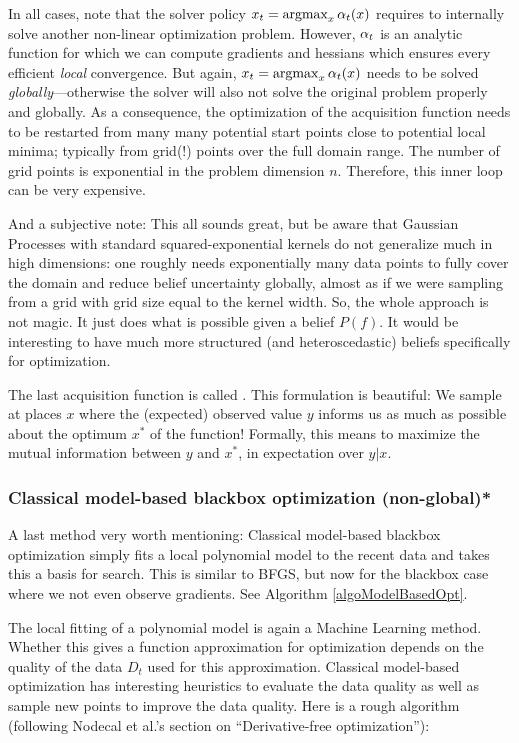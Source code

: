 In all cases, note that the solver policy $x_t = \operatorname*{argmax}_x \alpha_t(x)$
requires to internally solve another non-linear optimization
problem. However, $\alpha_t$ is an analytic function for which we can
compute gradients and hessians which ensures every
efficient \emph{local} convergence. But again, $x_t = \operatorname*{argmax}_x \alpha_t(x)$
needs to be solved \emph{globally}---otherwise the solver will also
not solve the original problem properly and globally. As a
consequence, the optimization of the acquisition function needs to be
restarted from many many potential start points close to potential
local minima; typically from grid(!) points over the full domain
range. The number of grid points is exponential in the problem
dimension $n$. Therefore, this inner loop can be very expensive.

And a subjective note: This all sounds great, but be aware that
Gaussian Processes with standard squared-exponential kernels do not
generalize much in high dimensions: one roughly needs exponentially
many data points to fully cover the domain and reduce belief
uncertainty globally, almost as if we were sampling from a grid with
grid size equal to the kernel width. So, the whole approach is not
magic. It just does what is possible given a belief $P(f)$. It would
be interesting to have much more structured (and heteroscedastic)
beliefs specifically for optimization.

The last acquisition function is called . This formulation is beautiful: We sample at places $x$ where
the (expected) observed value $y$ informs us as much as possible about
the optimum $x^*$ of the function! Formally, this means to maximize
the mutual information between $y$ and $x^*$, in expectation over $y|x$.



\subsubsection{Classical model-based blackbox optimization (non-global)*}

A last method very worth mentioning: Classical model-based blackbox
optimization simply fits a local polynomial model to the recent data
and takes this a basis for search. This is similar to BFGS, but now
for the blackbox case where we not even observe gradients. See
Algorithm \ref{algoModelBasedOpt}.

The local fitting of a polynomial model is again a Machine Learning
method. Whether this gives a function approximation for optimization
depends on the quality of the data $D_t$ used for this
approximation. Classical model-based optimization has interesting
heuristics to evaluate the data quality as well as sample new points
to improve the data quality. Here is a rough algorithm (following
Nodecal et al.'s section on ``Derivative-free optimization''):

